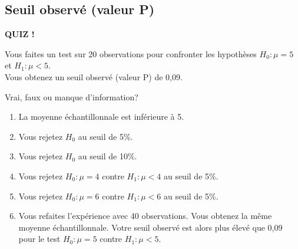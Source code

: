 \documentclass{BeamerTemplate}
\begin{document}
\subsection{Seuil observé (valeur P)}

\begin{frame}[t]{}

\centerline{\LARGE\bf \alert{QUIZ !}}
\medskip
Vous faites un test sur 20 observations  pour confronter les hypothèses $H_0: \mu=5$ et $H_1: \mu<5$.\\ Vous obtenez un seuil observé (valeur P) de 0,09.

Vrai, faux ou manque d'information?
\begin{enumerate}\itemsep2mm
\item La moyenne échantillonnale est inférieure à 5.
\item Vous rejetez $H_0$ au seuil de 5\%.
\item Vous rejetez $H_0$ au seuil de 10\%.
\item Vous rejetez $H_0: \mu=4$ contre $H_1: \mu<4$ au seuil de 5\%.
\item Vous rejetez $H_0: \mu=6$ contre $H_1: \mu<6$ au seuil de 5\%.
\item Vous refaites l'expérience avec 40 observations. Vous obtenez la même moyenne échantillonnale. Votre seuil observé est alors plus élevé que 0,09 pour le test $H_0: \mu=5$ contre $H_1: \mu<5$.
\end{enumerate}



\end{frame}
\end{document}
